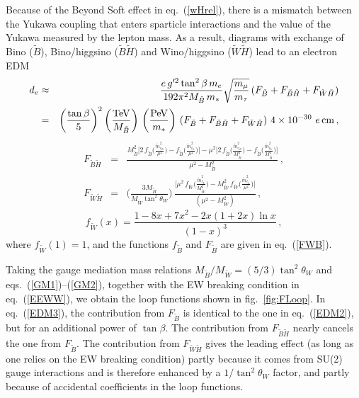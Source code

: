 \documentclass[a4paper,12pt]{article}
\newcommand{\bea}{\begin{eqnarray}}
\newcommand{\eea}{\end{eqnarray}}
\newcommand{\beq}{\begin{equation}}
\newcommand{\eeq}{\end{equation}}
\def\eq#1{eq.~(\ref{#1})}
\def\fig#1{fig.~\ref{#1}}
\def\eq#1{eq.~(\ref{#1})}
\def\fig#1{fig.~\ref{#1}}
\def\mst{m_*}
\begin{document}
{{{{Because of the Beyond Soft effect in \eq{wHrel}, there is a mismatch between the Yukawa coupling that enters sparticle interactions and the value of the Yukawa measured by the lepton mass. As a result, diagrams with exchange of Bino (${\tilde B}$), Bino/higgsino (${\tilde B}{\tilde H}$) and Wino/higgsino (${\tilde W}{\tilde H}$) lead to an electron EDM
\bea
d_e &\approx& \frac{e\,g^{\prime 2}  \tan^2\beta \, m_e}{192 \pi^2 M_{\tilde B}\, \mst}\sqrt{\frac{m_\mu}{m_\tau}}\, (F_{\tilde B}+ F_{\tilde B \tilde H} +F_{\tilde W \tilde H})
\nonumber \\
&=& \left(\frac{\tan \beta}{5}\right)^2  \left( \frac{\rm TeV}{M_{\tilde B}}\right)\, \left( \frac{{\rm PeV}}{\mst}\right) \, (F_{\tilde B}+ F_{\tilde B \tilde H} +F_{\tilde W \tilde H})~4\times 10^{-30} ~e\,{\rm cm}\, ,
\label{EDM3}
\eea
\bea
F_{{\tilde B}{\tilde H}}\!\!\!&=&\!\!\!\frac{M_{\tilde B}^2
 \Big[ 
2\, f_{\tilde B}\Big( \frac{{\tilde m}_{e_R}^2}{\mu^2}\Big)-
f_{\tilde B}\Big( \frac{{\tilde m}_{\ell_L}^2}{\mu^2}\Big) \Big] -
\mu^2 \Big[ 
2\, f_{\tilde B}\Big( \frac{{\tilde m}_{e_R}^2}{M_{\tilde B}^2}\Big)-
f_{\tilde B}\Big( \frac{{\tilde m}_{\ell_L}^2}{M_{\tilde B}^2}\Big) \Big] }
{\mu^2- M_{\tilde B}^2} \, ,
\\
F_{{\tilde W}{\tilde H}}\!\!\!&=&\!\!\! \bigg( \frac{3M_{\tilde B}}{M_{\tilde W}\tan^2\theta_W}\bigg)\,\frac{\Big[
\mu^2  \,
f_{\tilde W}\Big( \frac{{\tilde m}_{\ell_L}^2}{M_{\tilde W}^2}\Big) 
- M_{\tilde W}^2 \,
 f_{\tilde W}\Big( \frac{{\tilde m}_{\ell_L}^2}{\mu^2}\Big)\Big]}
{(\mu^2- M_{\tilde W}^2)} \, , 
\eea
\beq
 f_{\tilde W}(x) =\frac{1-8x+7x^2-2x(1+2x)\ln x}{(1-x)^3} 
\, , 
\eeq
where $f_{\tilde W}(1) =1$, and the functions $f_{\tilde B}$ and $F_{\tilde B}$ are given in \eq{FWB}.

Taking the gauge mediation mass relations $M_{\tilde B}/M_{\tilde W}=(5/3)\tan^2\theta_W$ and eqs.~(\ref{GM1})--(\ref{GM2}), together with the EW breaking condition in \eq{EEWW}, we obtain the loop functions shown in \fig{fig:FLoop}. In \eq{EDM3}, the contribution from $F_{\tilde B}$ is identical to the one in \eq{EDM2}, but for an additional power of $\tan\beta$. The contribution from $F_{\tilde B \tilde H}$ nearly cancels the one from $F_{\tilde B}$. The contribution from $F_{\tilde W \tilde H}$ gives the leading effect (as long as one relies on the EW breaking condition) partly because it comes from SU(2) gauge interactions and is therefore enhanced by a $1/\tan^2\theta_W$ factor, and partly because of accidental coefficients in the loop functions.

}}}}
\end{document}
